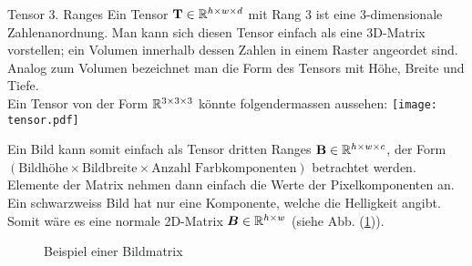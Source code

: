\begin{defbox}{Tensor 3. Ranges}
  Ein Tensor $\ten{T} \in \set{R}^{h \times w \times d}$ mit Rang 3 ist eine 3-dimensionale Zahlenanordnung. Man kann sich
  diesen Tensor einfach als eine 3D-Matrix vorstellen; ein Volumen innerhalb
  dessen Zahlen in einem Raster angeordet sind.
  Analog zum Volumen bezeichnet man die Form des Tensors mit Höhe, Breite und
  Tiefe. \\
  Ein Tensor von der Form $\set{R}^{3 \times 3 \times 3}$ könnte folgendermassen
  aussehen:
  \para{}
  \texttt{[image: tensor.pdf]}

\end{defbox}
\para{}
Ein Bild kann somit einfach als Tensor dritten Ranges $\ten{B} \in \set{R}^{h
  \times w \times c}$, der Form $(\text{Bildhöhe} \times \text{Bildbreite}
\times \text{Anzahl Farbkomponenten})$ betrachtet werden.
Elemente der Matrix nehmen dann einfach die Werte der Pixelkomponenten an.
Ein schwarzweiss Bild hat nur eine Komponente, welche die Helligkeit angibt.
Somit wäre es eine normale 2D-Matrix $\mat{B} \in \set{R}^{h \times w}$ (siehe
Abb. (\ref{fig:bildmatrix})).
\para{}
\begin{figure}[h!]
  \begin{tikzpicture}

  \end{tikzpicture}
  \caption{Beispiel einer Bildmatrix}
  \label{fig:bildmatrix}
\end{figure}

\cite{deeplearning.ai:cnn}
\cite{wiki:tensor}

